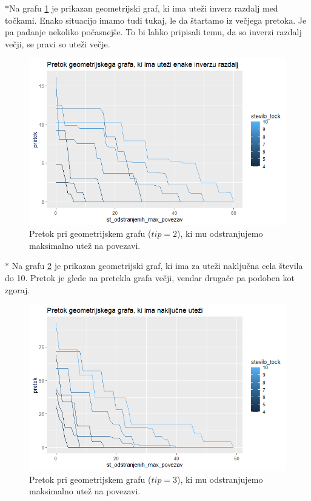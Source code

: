 \documentclass[a4paper]{article}
\begin{document}
$\ast$Na grafu \ref{fig13} je prikazan geometrijski graf, ki ima uteži inverz razdalj med točkami. Enako situacijo imamo tudi tukaj, le da štartamo iz večjega pretoka. Je pa padanje nekoliko počasnejše. To bi lahko pripisali temu, da so inverzi razdalj večji, se pravi so uteži večje. %
\begin{figure}[H]
\centerline{\includegraphics[scale=.5]{p7_1.PNG}}
\caption{Pretok pri geometrijskem grafu ($tip = 2$), ki mu odstranjujemo maksimalno utež na povezavi.}
\label{fig13}
\end{figure}

$\ast$ Na grafu \ref{fig14} je prikazan geometrijski graf, ki ima za uteži naključna cela števila do 10. Pretok je glede na pretekla grafa večji, vendar drugače pa podoben kot zgoraj.
\begin{figure}[H]
\centerline{\includegraphics[scale=.5]{p9_1.PNG}}
\caption{Pretok pri geometrijskem grafu ($tip = 3$), ki mu odstranjujemo maksimalno utež na povezavi.}
\label{fig14}
\end{figure}  
\end{document}
